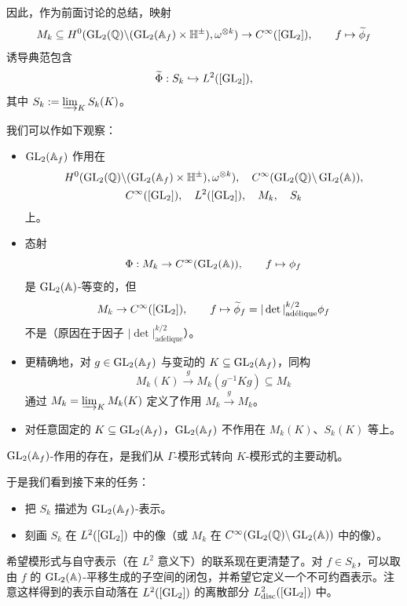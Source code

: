 因此，作为前面讨论的总结，映射
\[
M_k\subseteq H^0(\operatorname{GL}_2(\mathbb{Q})\backslash(\operatorname{GL}_2(\mathbb{A}_f)\times\mathbb{H}^\pm),\omega^{\otimes k})\to C^\infty([\operatorname{GL}_2]),\qquad f\mapsto\widetilde\phi_f
\]
诱导典范包含
\[
\widetilde\Phi:S_k\hookrightarrow L^2([\operatorname{GL}_2]),
\]
其中 $S_k:=\varinjlim_KS_k(K)$。

我们可以作如下观察：
\begin{itemize}
\item $\operatorname{GL}_2(\mathbb{A}_f)$ 作用在
\[
\begin{gathered}
H^0(\operatorname{GL}_2(\mathbb{Q})\backslash(\operatorname{GL}_2(\mathbb{A}_f)\times\mathbb{H}^\pm),\omega^{\otimes k}),\quad
C^\infty(\operatorname{GL}_2(\mathbb{Q})\backslash\operatorname{GL}_2(\mathbb{A})),\\
C^\infty([\operatorname{GL}_2]),\quad L^2([\operatorname{GL}_2]),\quad M_k,\quad S_k
\end{gathered}
\]
上。
\item 态射
\[
\Phi:M_k\to C^\infty(\operatorname{GL}_2(\mathbb{A})),\qquad f\mapsto\phi_f
\]
是 $\operatorname{GL}_2(\mathbb{A})$-等变的，但
\[
M_k\to C^\infty([\operatorname{GL}_2]),\qquad f\mapsto\widetilde\phi_f=|\det|^{k/2}_{\mathrm{ad\acute{e}lique}}\phi_f
\]
不是（原因在于因子 $|\det|^{k/2}_{\mathrm{ad\acute{e}lique}}$）。
\item 更精确地，对 $g\in\operatorname{GL}_2(\mathbb{A}_f)$ 与变动的 $K\subseteq\operatorname{GL}_2(\mathbb{A}_f)$，同构
\[
M_k(K)\xrightarrow{\ g\ }M_k(g^{-1}Kg)\subseteq M_k
\]
通过 $M_k=\varinjlim_KM_k(K)$ 定义了作用 $M_k\xrightarrow{\ g\ }M_k$。
\item 对任意固定的 $K\subseteq\operatorname{GL}_2(\mathbb{A}_f)$，$\operatorname{GL}_2(\mathbb{A}_f)$ 不作用在 $M_k(K)$、$S_k(K)$ 等上。
\end{itemize}

$\operatorname{GL}_2(\mathbb{A}_f)$-作用的存在，是我们从 $\Gamma$-模形式转向 $K$-模形式的主要动机。

于是我们看到接下来的任务：
\begin{itemize}
\item 把 $S_k$ 描述为 $\operatorname{GL}_2(\mathbb{A}_f)$-表示。
\item 刻画 $S_k$ 在 $L^2([\operatorname{GL}_2])$ 中的像（或 $M_k$ 在 $C^\infty(\operatorname{GL}_2(\mathbb{Q})\backslash\operatorname{GL}_2(\mathbb{A}))$ 中的像）。
\end{itemize}

希望模形式与自守表示（在 $L^2$ 意义下）的联系现在更清楚了。对 $f\in S_k$，可以取由 $f$ 的 $\operatorname{GL}_2(\mathbb{A})$-平移生成的子空间的闭包，并希望它定义一个不可约酉表示。注意这样得到的表示自动落在 $L^2([\operatorname{GL}_2])$ 的离散部分 $L^2_{\mathrm{disc}}([\operatorname{GL}_2])$ 中。
